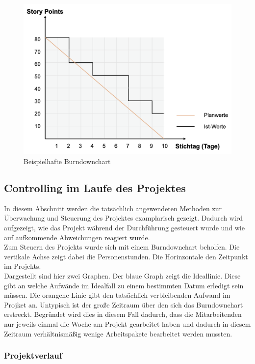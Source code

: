 \documentclass[ThesisDJ.tex]{subfiles}
\begin{document}
    \begin{figure}
        \includegraphics[scale=0.5]{burndown.png}
        \centering
        \caption{Beispielhafte Burndownchart}
        \label{fig:burndown}
    \end{figure}

    \subsection{Controlling im Laufe des Projektes}
    In diesem Abschnitt werden die tatsächlich angewendeten Methoden zur Überwachung und Steuerung des 
    Projektes examplarisch gezeigt. Dadurch wird aufgezeigt, wie das Projekt während der Durchführung gesteuert wurde 
    und wie auf aufkommende Abweichungen reagiert wurde.\\
    Zum Steuern des Projekts wurde sich mit einem Burndownchart beholfen. Die vertikale Achse zeigt dabei die Personenstunden. Die Horinzontale den Zeitpunkt im Projekts.\\
Dargestellt sind hier zwei Graphen. Der blaue Graph zeigt die Ideallinie. Diese gibt an welche Aufwände im Idealfall zu einem bestimmten Datum erledigt sein müssen. Die orangene Linie gibt den tatsächlich verbleibenden Aufwand im Projket an. Untypisch ist der große Zeitraum über den sich das Burndownchart erstreckt. Begründet wird dies in diesem Fall dadurch, dass die Mitarbeitenden nur jeweils einmal die Woche am Projekt gearbeitet haben und dadurch in diesem Zeitraum verhältnismäßig wenige Arbeitspakete bearbeitet werden mussten.

\subsubsection{Projektverlauf}
\end{document}
